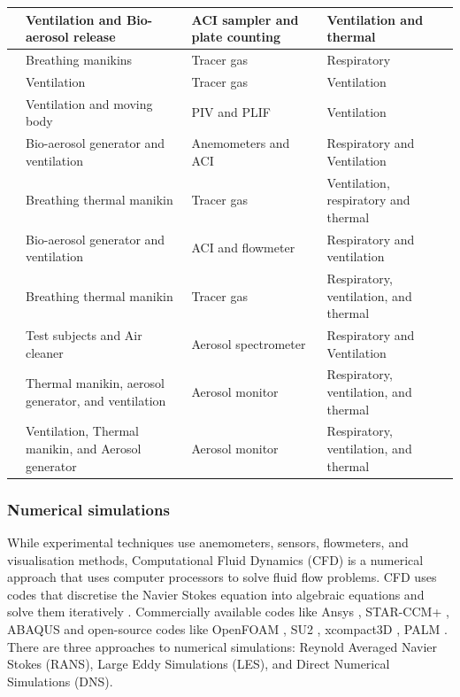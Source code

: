 \documentclass[a4paper,12pt]{elsarticle}
\begin{document}
\begin{longtable}{|m{3.55cm}|m{3.5cm}|m{3.5cm}|m{3.5cm}|}
    \hline
    \citet{liu2020experimental}& Ventilation and Bio-aerosol release & ACI sampler and plate counting & Ventilation and thermal \\
    \hline
    \citet{qian2008dispersion}& Breathing manikins & Tracer gas & Respiratory\\
    \hline
    \citet{lu2020reducing}& Ventilation & Tracer gas & Ventilation\\
    \hline
    \citet{poussou2010flow}& Ventilation and moving body & PIV and PLIF & Ventilation \\
    \hline
    \citet{liu2020full}& Bio-aerosol generator and ventilation & Anemometers and ACI & Respiratory and Ventilation \\
    \hline
    \citet{cheng2021experimental}& Breathing thermal manikin & Tracer gas & Ventilation, respiratory and thermal\\
    \hline
    \citet{liu2023estimating}& Bio-aerosol generator and ventilation & ACI and flowmeter & Respiratory and ventilation \\
    \hline
    \citet{li2021effects}& Breathing thermal manikin & Tracer gas & Respiratory, ventilation, and thermal\\
    \hline
    \citet{duill2021impact}& Test subjects and Air cleaner &  Aerosol spectrometer & Respiratory and Ventilation\\
    \hline
    \citet{zhou2021experimental}& Thermal manikin, aerosol generator, and ventilation  & Aerosol monitor & Respiratory, ventilation, and thermal \\
    \hline
    \citet{zhang2019distribution}& Ventilation, Thermal manikin, and Aerosol generator & Aerosol monitor & Respiratory, ventilation, and thermal\\
    \hline
\end{longtable}

\subsubsection{Numerical simulations}

While experimental techniques use anemometers, sensors, flowmeters, and visualisation methods, Computational Fluid Dynamics (CFD) is a numerical approach that uses computer processors to solve fluid flow problems. CFD uses codes that discretise the Navier Stokes equation into algebraic equations and solve them iteratively \cite{ferziger2002computational}. Commercially available codes like Ansys \cite{ANSYS}, STAR-CCM+ \cite{starccm}, ABAQUS \cite{abaqus} and open-source codes like OpenFOAM \cite{openfoam}, SU2 \cite{su2}, xcompact3D \cite{xcompact3d}, PALM \cite{palm}. There are three approaches to numerical simulations: Reynold Averaged Navier Stokes (RANS), Large Eddy Simulations (LES), and Direct Numerical Simulations (DNS).
\end{document}

